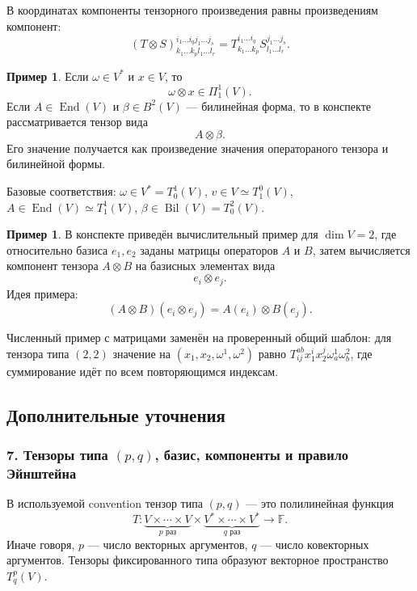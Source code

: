 \documentclass[12pt,a4paper]{article}
\theoremstyle{definition}
\newtheorem{example}[definition]{Пример}
\theoremstyle{plain}
\theoremstyle{remark}
\newenvironment{knowledgefix}{\begin{clarifybox}}{\end{clarifybox}}
\newcommand{\F}{\mathbb{F}}
\newcommand{\End}{\operatorname{End}}
\newcommand{\Tens}[2]{\Pi^{#2}_{#1}(V)}
\begin{document}
В координатах компоненты тензорного произведения равны произведениям компонент:
\[
    (T\otimes S)^{i_1\ldots i_q j_1\ldots j_s}_{k_1\ldots k_p l_1\ldots l_r}
    =
    T^{i_1\ldots i_q}_{k_1\ldots k_p}
    S^{j_1\ldots j_s}_{l_1\ldots l_r}.
\]

\begin{example}
Если $\omega\in V^*$ и $x\in V$, то
\[
    \omega\otimes x\in \Tens{1}{1}.
\]
Если $A\in\End(V)$ и $\beta\in B^2(V)$ --- билинейная форма, то в конспекте рассматривается тензор вида
\[
    A\otimes \beta.
\]
Его значение получается как произведение значения оператораного тензора и билинейной формы.
\begin{knowledgefix}
Базовые соответствия: \(\omega\in V^*=T^1_0(V)\), \(v\in V\simeq T^0_1(V)\), \(A\in\End(V)\simeq T^1_1(V)\), \(\beta\in\operatorname{Bil}(V)=T^2_0(V)\).
\end{knowledgefix}
\end{example}

\begin{example}
В конспекте приведён вычислительный пример для $\dim V=2$, где относительно базиса $e_1,e_2$ заданы матрицы операторов $A$ и $B$, затем вычисляется компонент тензора $A\otimes B$ на базисных элементах вида
\[
    e_i\otimes e_j.
\]
Идея примера:
\[
    (A\otimes B)(e_i\otimes e_j)=A(e_i)\otimes B(e_j).
\]
\begin{knowledgefix}
Численный пример с матрицами заменён на проверенный общий шаблон: для тензора типа \((2,2)\) значение на \((x_1,x_2,\omega^1,\omega^2)\) равно \(T^{ab}_{ij}x_1^i x_2^j\omega^1_a\omega^2_b\), где суммирование идёт по всем повторяющимся индексам.
\end{knowledgefix}
\end{example}

\subsection*{Дополнительные уточнения}

\subsubsection*{7. Тензоры типа $(p,q)$, базис, компоненты и правило Эйнштейна}
В используемой convention тензор типа $(p,q)$ --- это полилинейная функция
\[
    T: \underbrace{V\times\cdots\times V}_{p\text{ раз}}
       \times
       \underbrace{V^*\times\cdots\times V^*}_{q\text{ раз}}
       \to \F.
\]
Иначе говоря, $p$ --- число векторных аргументов, $q$ --- число ковекторных аргументов.
Тензоры фиксированного типа образуют векторное пространство $T^p_q(V)$.
\end{document}
